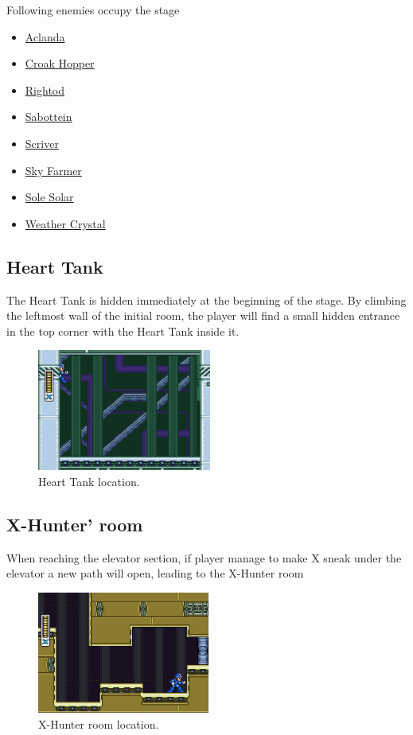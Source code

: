 Following enemies occupy the stage~\cite{wiki:weather_control}
\begin{itemize}
	\item \hyperlink{enem:Aclanda}{Aclanda}
	\item \hyperlink{enem:Croak_hopper}{Croak Hopper}
	\item \hyperlink{enem:Rightod}{Rightod}
	\item \hyperlink{enem:Sabottein}{Sabottein}
	\item \hyperlink{enem:Scriver}{Scriver}
	\item \hyperlink{enem:Sky_farmer}{Sky Farmer}
	\item \hyperlink{enem:Sole_solar}{Sole Solar}
	\item \hyperlink{enem:Weather_crystal}{Weather Crystal}
\end{itemize}


\subsection{Heart Tank}
The Heart Tank is hidden immediately at the beginning of the stage. By climbing the leftmost wall of the initial room, the player will find a small hidden entrance in the top corner with the Heart Tank inside it.

\begin{figure}[htp]
	\centering
		\includegraphics[height=4cm]{figures/X2/Wire_sponge/Sponge_heart.jpg}
		\caption{Heart Tank location.}
\end{figure}
\subsection{X-Hunter' room}
When reaching the elevator section, if player manage to make X sneak under the elevator a new path will open, leading to the X-Hunter room
	\begin{figure}[htp]
	\centering
	\includegraphics[height=4cm]{figures/X2/Wire_sponge/Sponge_Hunter_room.jpg}
	\caption{X-Hunter room location.}
\end{figure}
